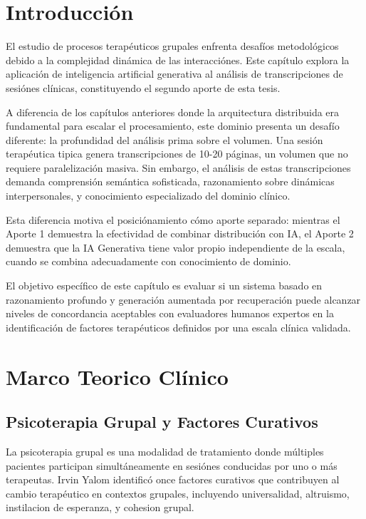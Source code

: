 \documentclass[12pt,a4paper,twoside]{book}
\begin{document}
\vspace{1cm}

\section{Introducción}

El estudio de procesos terapéuticos grupales enfrenta desafíos metodológicos debido a la complejidad dinámica de las interacciónes. Este capítulo explora la aplicación de inteligencia artificial generativa al análisis de transcripciones de sesiónes clínicas, constituyendo el segundo aporte de esta tesis.

A diferencia de los capítulos anteriores donde la arquitectura distribuida era fundamental para escalar el procesamiento, este dominio presenta un desafío diferente: la profundidad del análisis prima sobre el volumen. Una sesión terapéutica tipica genera transcripciones de 10-20 páginas, un volumen que no requiere paralelización masiva. Sin embargo, el análisis de estas transcripciones demanda comprensión semántica sofisticada, razonamiento sobre dinámicas interpersonales, y conocimiento especializado del dominio clínico.

Esta diferencia motiva el posiciónamiento cómo aporte separado: mientras el Aporte 1 demuestra la efectividad de combinar distribución con IA, el Aporte 2 demuestra que la IA Generativa tiene valor propio independiente de la escala, cuando se combina adecuadamente con conocimiento de dominio.

El objetivo específico de este capítulo es evaluar si un sistema basado en razonamiento profundo y generación aumentada por recuperación puede alcanzar niveles de concordancia aceptables con evaluadores humanos expertos en la identificación de factores terapéuticos definidos por una escala clínica validada.

\section{Marco Teorico Clínico}

\subsection{Psicoterapia Grupal y Factores Curativos}

La psicoterapia grupal es una modalidad de tratamiento donde múltiples pacientes participan simultáneamente en sesiónes conducidas por uno o más terapeutas. Irvin Yalom \cite{yalom2005group} identificó once factores curativos que contribuyen al cambio terapéutico en contextos grupales, incluyendo universalidad, altruismo, instilacion de esperanza, y cohesion grupal.
\end{document}
